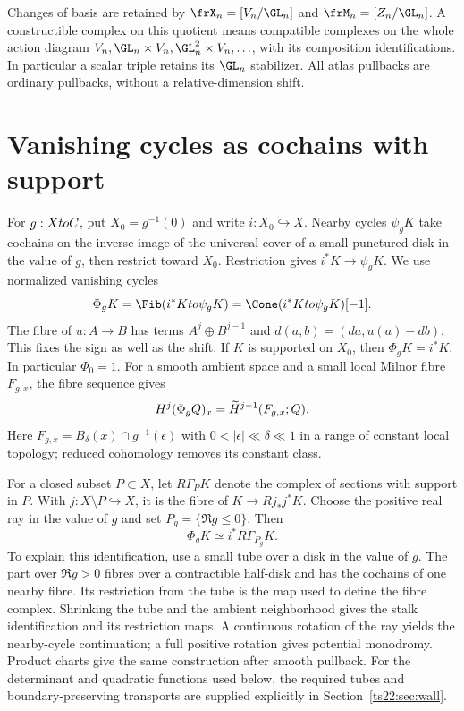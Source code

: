 Changes of basis are retained by
$\frX_n=[V_n/\GL_n]$ and $\frM_n=[Z_n/\GL_n]$.
A constructible complex on this quotient means compatible complexes
on the whole action diagram
$V_n,\GL_n\times V_n,\GL_n^2\times V_n,\ldots$, with its composition
identifications. In particular a scalar triple retains its
$\GL_n$ stabilizer. All atlas pullbacks are ordinary pullbacks,
without a relative-dimension shift.

\section{Vanishing cycles as cochains with support}
\label{ts22:sec:support}

For $g:XtoC$, put $X_0=g^{-1}(0)$ and write $i:X_0\hookrightarrow X$.
Nearby cycles $\psi_gK$ take cochains on the inverse image of the
universal cover of a small punctured disk in the value of $g$, then
restrict toward $X_0$. Restriction gives $i^*K\to\psi_gK$.
We use normalized vanishing cycles
\[
 \Phi_gK=\Fib(i^*K\to\psi_gK)=\Cone(i^*K\to\psi_gK)[-1].
\]
The fibre of $u:A\to B$ has terms $A^j\oplus B^{j-1}$ and
$d(a,b)=(da,u(a)-db)$. This fixes the sign as well as the shift.
If $K$ is supported on $X_0$, then $\Phi_gK=i^*K$.
In particular $\Phi_0=1$.
For a smooth ambient space and a small local Milnor fibre $F_{g,x}$,
the fibre sequence gives
\[
 H^j(\Phi_gQ)_x=\widetilde H^{j-1}(F_{g,x};Q).
\]
Here $F_{g,x}=B_\delta(x)\cap g^{-1}(\epsilon)$ with
$0<|\epsilon|\ll\delta\ll1$ in a range of constant local topology;
reduced cohomology removes its constant class.

For a closed subset $P\subset X$, let $R\Gamma_PK$ denote the
complex of sections with support in $P$. With $j:X\setminus P\hookrightarrow X$,
it is the fibre of $K\to Rj_*j^*K$. Choose the positive real ray
in the value of $g$ and set $P_g=\{\Re g\le0\}$. Then
\[
             \Phi_gK\simeq i^*R\Gamma_{P_g}K.
\]
To explain this identification, use a small tube over a disk in the
value of $g$. The part over $\Re g>0$ fibres over a contractible
half-disk and has the cochains of one nearby fibre. Its restriction
from the tube is the map used to define the fibre complex. Shrinking the tube
and the ambient neighborhood gives the stalk identification and its
restriction maps. A continuous rotation of the ray yields the
nearby-cycle continuation; a full positive rotation gives potential
monodromy. Product charts give the same construction after smooth
pullback. For the determinant and quadratic functions used below,
the required tubes and boundary-preserving transports are supplied
explicitly in Section~\ref{ts22:sec:wall}.

